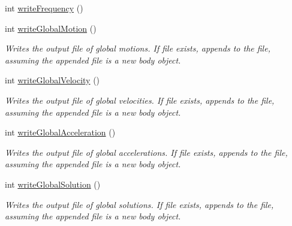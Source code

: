 \begin{DoxyCompactItemize}
int \hyperlink{classosea_1_1ofreq_1_1_file_writer_a99e8d1ffb93b50966735bb90d0f4e082}{write\-Frequency} ()
\item 
int \hyperlink{classosea_1_1ofreq_1_1_file_writer_ada34dffe391a0daeac192bd4b7ed0ce5}{write\-Global\-Motion} ()
\begin{DoxyCompactList}\small\item\em Writes the output file of global motions. If file exists, appends to the file, assuming the appended file is a new body object. \end{DoxyCompactList}\item 
int \hyperlink{classosea_1_1ofreq_1_1_file_writer_a9887a28316fca1417da81c95b04c2208}{write\-Global\-Velocity} ()
\begin{DoxyCompactList}\small\item\em Writes the output file of global velocities. If file exists, appends to the file, assuming the appended file is a new body object. \end{DoxyCompactList}\item 
int \hyperlink{classosea_1_1ofreq_1_1_file_writer_a1c49975afb40d028c42027e5239bcdaa}{write\-Global\-Acceleration} ()
\begin{DoxyCompactList}\small\item\em Writes the output file of global accelerations. If file exists, appends to the file, assuming the appended file is a new body object. \end{DoxyCompactList}\item 
int \hyperlink{classosea_1_1ofreq_1_1_file_writer_ae5977c7303f36b1ae0b71bf9251c8a59}{write\-Global\-Solution} ()
\begin{DoxyCompactList}\small\item\em Writes the output file of global solutions. If file exists, appends to the file, assuming the appended file is a new body object. \end{DoxyCompactList}\end{DoxyCompactItemize}
